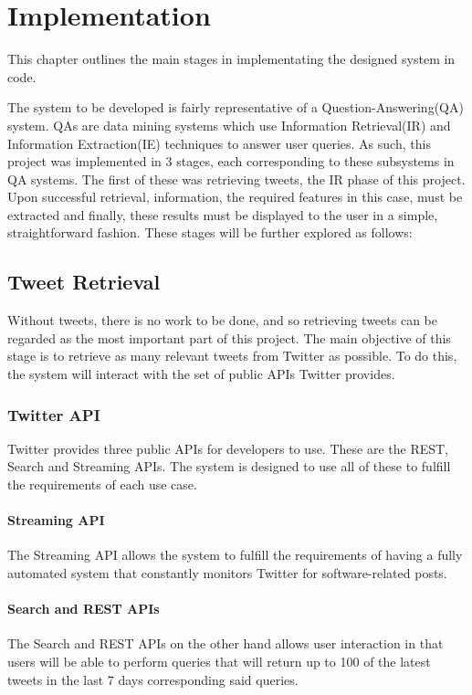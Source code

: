 \chapter{Implementation}
\label{cha:impl}
This chapter outlines the main stages in implementating the designed system in code.


The system to be developed is fairly representative of a Question-Answering(QA) system. QAs are data mining systems which use Information Retrieval(IR) and Information Extraction(IE) techniques to answer user queries. As such, this project was implemented in 3 stages, each corresponding to these subsystems in QA systems. The first of these was retrieving tweets, the IR phase of this project. Upon successful retrieval, information, the required features in this case, must be extracted and finally, these results must be displayed to the user in a simple, straightforward fashion. These stages will be further explored as follows:

\section{Tweet Retrieval}
Without tweets, there is no work to be done, and so retrieving tweets can be regarded as the most important part of this project. The main objective of this stage is to retrieve as many relevant tweets from Twitter as possible. To do this, the system will interact with the set of public APIs Twitter provides.

\subsection{Twitter API}
Twitter provides three public APIs for developers to use. These are the REST, Search and Streaming APIs. The system is designed to use all of these to fulfill the requirements of each use case.

\subsubsection{Streaming API}
The Streaming API allows the system to fulfill the requirements of having a fully automated system that constantly monitors Twitter for software-related posts.

\subsubsection{Search and REST APIs}
The Search and REST APIs on the other hand allows user interaction in that users will be able to perform queries that will return up to 100 of the latest tweets in the last 7 days corresponding said queries.


